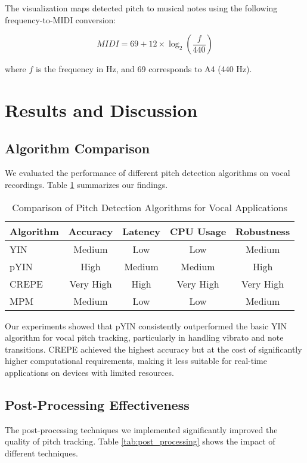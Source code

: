 \documentclass[conference]{IEEEtran}
\begin{document}
The visualization maps detected pitch to musical notes using the following frequency-to-MIDI conversion:

\begin{equation}
MIDI = 69 + 12 \times \log_2\left(\frac{f}{440}\right)
\end{equation}

where $f$ is the frequency in Hz, and 69 corresponds to A4 (440 Hz).

\section{Results and Discussion}

\subsection{Algorithm Comparison}
We evaluated the performance of different pitch detection algorithms on vocal recordings. Table \ref{tab:algorithm_comparison} summarizes our findings.

\begin{table}[htbp]
\caption{Comparison of Pitch Detection Algorithms for Vocal Applications}
\begin{center}
\begin{tabular}{|l|c|c|c|c|}
\hline
\textbf{Algorithm} & \textbf{Accuracy} & \textbf{Latency} & \textbf{CPU Usage} & \textbf{Robustness} \\
\hline
YIN & Medium & Low & Low & Medium \\
\hline
pYIN & High & Medium & Medium & High \\
\hline
CREPE & Very High & High & Very High & Very High \\
\hline
MPM & Medium & Low & Low & Medium \\
\hline
\end{tabular}
\label{tab:algorithm_comparison}
\end{center}
\end{table}

Our experiments showed that pYIN consistently outperformed the basic YIN algorithm for vocal pitch tracking, particularly in handling vibrato and note transitions. CREPE achieved the highest accuracy but at the cost of significantly higher computational requirements, making it less suitable for real-time applications on devices with limited resources.

\subsection{Post-Processing Effectiveness}
The post-processing techniques we implemented significantly improved the quality of pitch tracking. Table \ref{tab:post_processing} shows the impact of different techniques.
\end{document}
